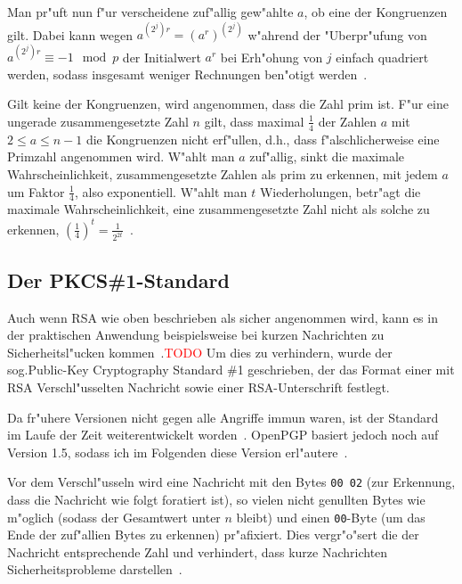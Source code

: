 \documentclass[12pt]{article}
\newcommand{\todo}[1]{\textcolor{red}{\mbox{TODO}}\marginpar{\textcolor{red}{#1}}}
\begin{document}
Man pr"uft nun f"ur verscheidene zuf"allig gew"ahlte $a$, ob eine der Kongruenzen gilt.
Dabei kann wegen $a^{(2^j)r} = (a^r)^{(2^j)}$ w"ahrend der "Uberpr"ufung von
$a^{(2^j)r} \equiv -1 \mod p$ der Initialwert $a^r$ bei Erh"ohung von $j$ einfach quadriert werden,
sodass insgesamt weniger Rechnungen ben"otigt werden~\cite{hac}.

Gilt keine der Kongruenzen, wird angenommen, dass die Zahl prim ist.
F"ur eine ungerade zusammengesetzte Zahl $n$ gilt,
dass maximal $\frac{1}{4}$ der Zahlen $a$ mit $2 \leq a \leq n-1$ die Kongruenzen nicht erf"ullen,
d.h., dass f"alschlicherweise eine Primzahl angenommen wird.
W"ahlt man $a$ zuf"allig, sinkt die maximale Wahrscheinlichkeit, zusammengesetzte Zahlen als prim zu erkennen,
mit jedem $a$ um Faktor $\frac{1}{4}$, also exponentiell.
W"ahlt man $t$ Wiederholungen, betr"agt die maximale Wahrscheinlichkeit, eine zusammengesetzte Zahl nicht als solche zu erkennen,
$\left(\frac{1}{4}\right)^t = \frac{1}{2^{2t}}$~\cite{hac}.

\subsection{Der PKCS\#1-Standard}

Auch wenn RSA wie oben beschrieben als sicher angenommen wird, kann es in der praktischen
Anwendung beispielsweise bei kurzen Nachrichten zu Sicherheitsl"ucken kommen~\cite{sinews}.\todo{Auch komplett zitieren?}
Um dies zu verhindern, wurde der sog.\@ Public-Key Cryptography Standard \#1 geschrieben,
der das Format einer mit RSA Verschl"usselten Nachricht sowie einer RSA-Unterschrift festlegt.

Da fr"uhere Versionen nicht gegen alle Angriffe immun waren, ist der Standard
im Laufe der Zeit weiterentwickelt worden~\cite{sinews}.
OpenPGP basiert jedoch noch auf Version 1.5, sodass ich im Folgenden diese Version erl"autere~\cite{rfc4480}.

Vor dem Verschl"usseln wird eine Nachricht mit den Bytes \verb|00 02|
(zur Erkennung, dass die Nachricht wie folgt foratiert ist),
so vielen nicht genullten Bytes wie m"oglich (sodass der Gesamtwert unter $n$ bleibt)
und einen \verb|00|-Byte (um das Ende der zuf"allien Bytes zu erkennen) pr"afixiert.
Dies vergr"o"sert die der Nachricht entsprechende Zahl und verhindert,
dass kurze Nachrichten Sicherheitsprobleme darstellen~\cite{rfc4480,sinews}.
\end{document}
